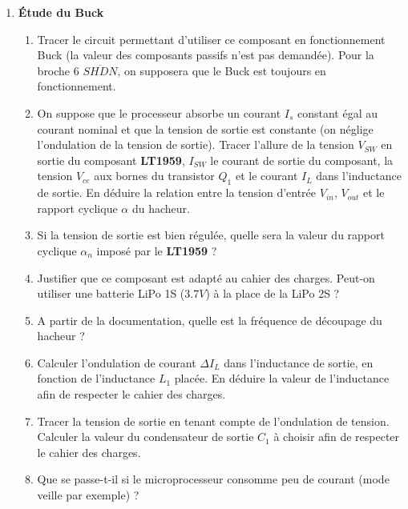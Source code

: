 \begin{enumerate}

\item \textbf{Étude du Buck}

\begin{enumerate}

\item Tracer le circuit permettant d'utiliser ce composant en fonctionnement Buck (la valeur des composants passifs n'est pas demandée). Pour la broche 6 $\overline{SHDN}$, on supposera que le Buck est toujours en fonctionnement.

\item On suppose que le processeur absorbe un courant $I_s$ constant égal au courant nominal et que la tension de sortie est constante (on néglige l'ondulation de la tension de sortie). Tracer l'allure de la tension $V_{SW}$ en sortie du composant \textbf{LT1959}, $I_{SW}$ le courant de sortie du composant, la tension $V_{ce}$ aux bornes du transistor $Q_1$ et le courant $I_{L}$ dans l'inductance de sortie. En déduire la relation entre la tension d'entrée $V_{in}$, $V_{out}$ et le rapport cyclique $\alpha$ du hacheur.

\item Si la tension de sortie est bien régulée, quelle sera la valeur du rapport cyclique $\alpha_n$ imposé par le \textbf{LT1959} ?

\item Justifier que ce composant est adapté au cahier des charges. Peut-on utiliser une batterie LiPo 1S ($3.7 V$) à la place de la LiPo 2S ?

\item A partir de la documentation, quelle est la fréquence de découpage du hacheur ?

\item Calculer l'ondulation de courant $\Delta I_{L}$ dans l'inductance de sortie, en fonction de l'inductance $L_1$ placée. En déduire la valeur de l'inductance afin de respecter le cahier des charges.

\item Tracer la tension de sortie en tenant compte de l'ondulation de tension. Calculer la valeur du condensateur de sortie $C_1$ à choisir afin de respecter le cahier des charges.

\item Que se passe-t-il si le microprocesseur consomme peu de courant (mode veille par exemple) ?

\end{enumerate}


\end{enumerate}
